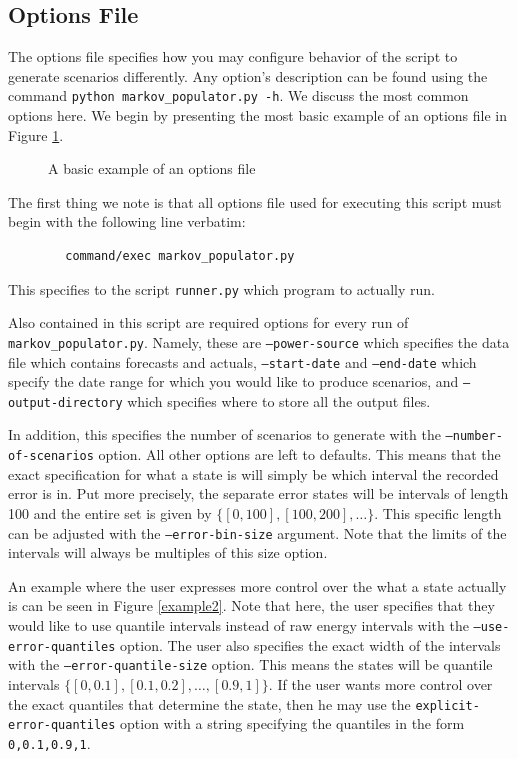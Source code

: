 \documentclass[11pt]{article}
\begin{document}
	\subsection{Options File}
	The options file specifies how you may configure behavior of the script to
	generate scenarios differently. Any option's description can be found using 
	the command \texttt{python markov\_populator.py -h}. We discuss the most
	common options here. We begin by presenting the most basic
	example of an options file in Figure \ref{example1}.
	
	\begin{figure}[H]
	\begin{framed}
		
	\end{framed}
	\label{example1}
	\caption{A basic example of an options file}
	\end{figure}
	
	The first thing we note is that all options file used for executing this
	script must begin with the following line verbatim:
	\begin{verbatim}
		command/exec markov_populator.py
	\end{verbatim}
	This specifies to the script \texttt{runner.py} which program to actually
	run.
	
	Also contained in this script are required options for every run of 
	\texttt{markov\_populator.py}. Namely, these are \texttt{--power-source}
	which specifies the data file which contains forecasts and actuals, 
	\texttt{--start-date} and \texttt{--end-date} which specify the date range
	for which you would like to produce scenarios, and 
	\texttt{--output-directory} which specifies where to store all the output
	files.
	
	In addition, this specifies the number of scenarios to generate with the 
	\texttt{--number-of-scenarios} option. All other options are left to
	defaults. This means that the exact specification for what a state is
	will simply be which interval the recorded error is in. Put more precisely,
	the separate error states will be intervals of length 100 and the entire
	set is given by $\{[0, 100], [100, 200], \ldots\}$. This specific length
	can be adjusted with the \texttt{--error-bin-size} argument. Note that the
	limits of the intervals will always be multiples of this size option.
	
	An example where the user expresses more control over the what a state
	actually is can be seen in Figure \ref{example2}. Note that here, the user
	specifies that they would like to use quantile intervals instead of raw
	energy intervals with the \texttt{--use-error-quantiles} option. The user
	also specifies the exact width of the intervals with the 
	\texttt{--error-quantile-size} option. This means the states will 
	be quantile intervals $\{[0,0.1],[0.1,0.2],\ldots,[0.9,1]\}$. If the user
	wants more control over the exact quantiles that determine the state, then
	he may use the \texttt{explicit-error-quantiles} option with a string
	specifying the quantiles in the form \texttt{0,0.1,0.9,1}.
	
\end{document}
